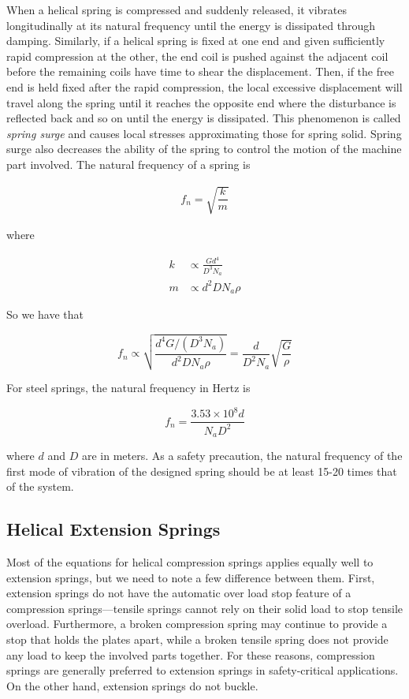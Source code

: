 \documentclass[
10pt,
a4paper,
openany,
svgnames,
]{book}
\begin{document}
When a helical spring is compressed and suddenly released, it vibrates longitudinally at its natural frequency until the energy is dissipated through damping. Similarly, if a helical spring is fixed at one end and given sufficiently rapid compression at the other, the end coil is pushed against the adjacent coil before the remaining coils have time to shear the displacement. Then, if the free end is held fixed after the rapid compression, the local excessive displacement will travel along the spring until it reaches the opposite end where the disturbance is reflected back and so on until the energy is dissipated. This phenomenon is called \emph{spring surge} and causes local stresses approximating those for spring solid. Spring surge also decreases the ability of the spring to control the motion of the machine part involved. The natural frequency of a spring is

\[\begin{gathered}
    f_n = \sqrt {\dfrac{k}{m}}
  \end{gathered} \]

where

\begin{align*}
    k &\propto \frac{Gd^4}{D^3N_a} \\
    m &\propto d^2DN_a\rho
\end{align*}

So we have that

\[f_n \propto \sqrt {\frac{d^4G/(D^3N_a)}{d^2DN_a\rho }}  = \frac{d}{D^2N_a}\sqrt {\frac{G}{\rho }} \]

For steel springs, the natural frequency in Hertz is

\begin{equation}
  f_n = \frac{3.53 \times 10^8d}{N_aD^2}
\end{equation}

where $d$ and $D$ are in meters.
As a safety precaution, the natural frequency of the first mode of vibration of the designed spring should be at least 15-20 times that of the system.

\subsection{Helical Extension Springs}

Most of the equations for helical compression springs applies equally well to extension springs, but we need to note a few difference between them. First, extension springs do not have the automatic over load stop feature of a compression springs—tensile springs cannot rely on their solid load to stop tensile overload. Furthermore, a broken compression spring may continue to provide a stop that holds the plates apart, while a broken tensile spring does not provide any load to keep the involved parts together. For these reasons, compression springs are generally preferred to extension springs in safety-critical applications. On the other hand, extension springs do not buckle.
\end{document}

